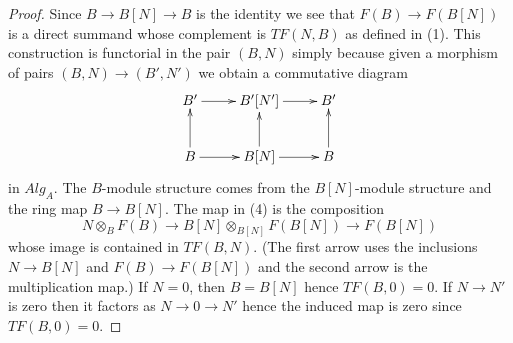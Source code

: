 \documentclass{stacks-project}
\theoremstyle{plain}
\theoremstyle{definition}
\theoremstyle{remark}
\numberwithin{equation}{subsection}
\begin{document}
\begin{proof}
Since $B \to B[N] \to B$ is the identity we see that $F(B) \to F(B[N])$
is a direct summand whose complement is $TF(N, B)$ as defined in (1).
This construction is functorial in the pair $(B, N)$ simply because
given a morphism of pairs $(B, N) \to (B', N')$ we obtain a commutative
diagram
$$
\xymatrix{
B' \ar[r] & B'[N'] \ar[r] & B' \\
B \ar[r] \ar[u] & B[N] \ar[r] \ar[u] & B \ar[u]
}
$$
in $\textit{Alg}_A$. The $B$-module structure comes from the $B[N]$-module
structure and the ring map $B \to B[N]$. The map in (4) is the
composition
$$
N \otimes_B F(B) \longrightarrow
B[N] \otimes_{B[N]} F(B[N]) \longrightarrow F(B[N])
$$
whose image is contained in $TF(B, N)$. (The first arrow uses the inclusions
$N \to B[N]$ and $F(B) \to F(B[N])$ and the second arrow is the multiplication
map.) If $N = 0$, then $B = B[N]$
hence $TF(B, 0) = 0$. If $N \to N'$ is zero then it factors as
$N \to 0 \to N'$ hence the induced map is zero since $TF(B, 0) = 0$.
\end{proof}
\end{document}
